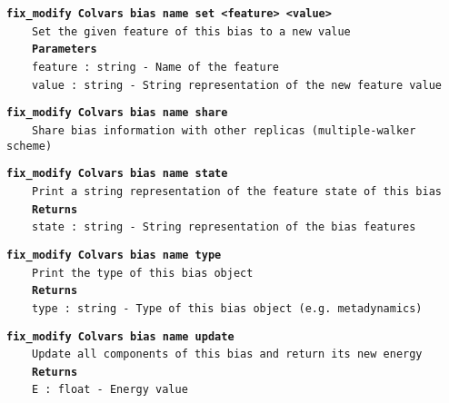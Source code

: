 \begin{mdexampleinput}{}
\texttt{\textbf{fix\_modify Colvars bias name set <feature> <value>}}
\\
\-~~~~\texttt{Set the given feature of this bias to a new value}
\\
\-~~~~\texttt{\textbf{Parameters}}
\\
\-~~~~\texttt{feature : string - Name of the feature}
\\
\-~~~~\texttt{value : string - String representation of the new feature value}
\end{mdexampleinput}
\begin{mdexampleinput}{}
\texttt{\textbf{fix\_modify Colvars bias name share}}
\\
\-~~~~\texttt{Share bias information with other replicas (multiple-walker scheme)}
\end{mdexampleinput}
\begin{mdexampleinput}{}
\texttt{\textbf{fix\_modify Colvars bias name state}}
\\
\-~~~~\texttt{Print a string representation of the feature state of this bias}
\\
\-~~~~\texttt{\textbf{Returns}}
\\
\-~~~~\texttt{state : string - String representation of the bias features}
\end{mdexampleinput}
\begin{mdexampleinput}{}
\texttt{\textbf{fix\_modify Colvars bias name type}}
\\
\-~~~~\texttt{Print the type of this bias object}
\\
\-~~~~\texttt{\textbf{Returns}}
\\
\-~~~~\texttt{type : string - Type of this bias object (e.g. metadynamics)}
\end{mdexampleinput}
\begin{mdexampleinput}{}
\texttt{\textbf{fix\_modify Colvars bias name update}}
\\
\-~~~~\texttt{Update all components of this bias and return its new energy}
\\
\-~~~~\texttt{\textbf{Returns}}
\\
\-~~~~\texttt{E : float - Energy value}
\end{mdexampleinput}
